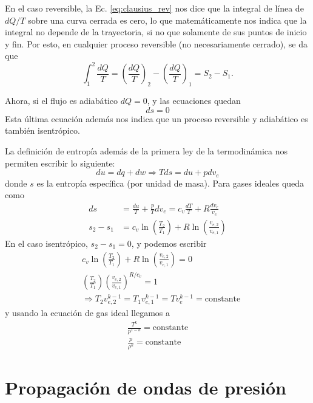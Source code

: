En el caso reversible, la Ec. \eqref{eq:clausius_rev} nos dice que la integral de línea de $dQ/T$ sobre una curva cerrada es cero, lo que matemáticamente nos indica que la integral no depende de la trayectoria, si no que solamente de sus puntos de inicio y fin.
Por esto, en cualquier proceso reversible (no necesariamente cerrado), se da que
%
\begin{equation}
\int_1^2\frac{dQ}{T} = \left(\frac{dQ}{T}\right)_2 -\left(\frac{dQ}{T}\right)_1 = S_2-S_1.
\end{equation}

Ahora, si el flujo es adiabático $dQ=0$, y las ecuaciones quedan
%
\begin{equation}
ds = 0 
\end{equation}
%
Esta última ecuación además nos indica que un proceso reversible y adiabático es también isentrópico.

La definición de entropía además de la primera ley de la termodinámica nos permiten escribir lo siguiente:
%
\begin{equation}
du = dq + dw \Rightarrow Tds = du+pdv_e
\end{equation}
%
donde $s$ es la entropía específica (por unidad de masa).
Para gases ideales queda como
%
\begin{align}
ds &= \frac{du}{T}+\frac{p}{T}dv_e = c_v\frac{dT}{T}+R\frac{dv_e}{v_e}\nonumber\\
s_2-s_1 &= c_v\ln\left(\frac{T_2}{T_1}\right) + R\ln\left(\frac{v_{e,2}}{v_{e,1}}\right) 
\end{align}
%
En el caso isentrópico, $s_2-s_1=0$, y podemos escribir
%
\begin{align}
&c_v\ln\left(\frac{T_2}{T_1}\right) + R\ln\left(\frac{v_{e,2}}{v_{e,1}}\right)=0 \nonumber\\
&\left(\frac{T_2}{T_1}\right)\left(\frac{v_{e,2}}{v_{e,1}}\right)^{R/c_v}=1\nonumber\\
&\Rightarrow T_2v_{e,2}^{k-1}=T_1v_{e,1}^{k-1}=Tv_{e}^{k-1}=\text{constante}
\end{align}
%
y usando la ecuación de gas ideal llegamos a
%
\begin{align}\label{eq:isentropico}
\frac{T^k}{p^{1-k}}=\text{constante}\nonumber\\
\frac{p}{\rho^k}=\text{constante}
\end{align}

\section*{Propagación de ondas de presión}

